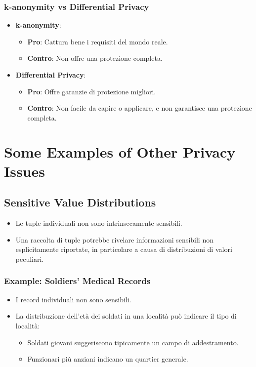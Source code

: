 \documentclass{report}
\begin{document}
\subsubsection{ k-anonymity vs Differential Privacy}

\begin{itemize}
    \item \textbf{k-anonymity}:
    \begin{itemize}
        \item \textbf{Pro}: Cattura bene i requisiti del mondo reale.
        \item \textbf{Contro}: Non offre una protezione completa.
    \end{itemize}
    
    \item \textbf{Differential Privacy}:
    \begin{itemize}
        \item \textbf{Pro}: Offre garanzie di protezione migliori.
        \item \textbf{Contro}: Non facile da capire o applicare, e non garantisce una protezione completa.
    \end{itemize}
\end{itemize}


\section{Some Examples of Other Privacy Issues}

\subsection{Sensitive Value Distributions}
\begin{itemize}
    \item Le tuple individuali non sono intrinsecamente sensibili.
    \item Una raccolta di tuple potrebbe rivelare informazioni sensibili non esplicitamente riportate, in particolare a causa di distribuzioni di valori peculiari.
\end{itemize}

\subsubsection{Example: Soldiers' Medical Records}
\begin{itemize}
    \item I record individuali non sono sensibili.
    \item La distribuzione dell'età dei soldati in una località può indicare il tipo di località:
    \begin{itemize}
        \item Soldati giovani suggeriscono tipicamente un campo di addestramento.
        \item Funzionari più anziani indicano un quartier generale.
    \end{itemize}
\end{itemize}
\end{document}
